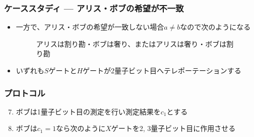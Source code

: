 \begin{frame}
  \frametitle{ケーススタディ --- アリス・ボブの希望が不一致}

  \pause
  \begin{itemize}
    \item<+-> 一方で、アリス・ボブの希望が一致しない場合$a \ne b$なので次のようになる
    \begin{figure}
      \caption{アリスは割り勘・ボブは奢り、またはアリスは奢り・ボブは割り勘}
      \label{fig:a_eq_1_b_eq_0}
    \end{figure}
  
    \item<+-> いずれも$S$ゲートと$H$ゲートが2量子ビット目へテレポーテーションする
  \end{itemize}

\end{frame}

\begin{frame}
  \frametitle{プロトコル}

  \begin{enumerate}
    \setcounter{enumi}{6}

    \item<+-> ボブは1量子ビット目の測定を行い測定結果を$c_1$とする
    \begin{figure}
    \end{figure}

    \item<+-> ボブは$c_1 = 1$なら次のように$X$ゲートを2, 3量子ビット目に作用させる
    \begin{figure}
    \end{figure}
  \end{enumerate}

\end{frame}

